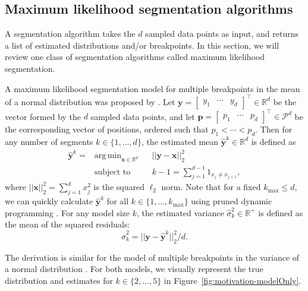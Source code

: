 \documentclass{jsfds} %
\DeclareMathOperator*{\argmin}{arg\,min}
\newcommand{\RR}{\mathbb{R}}
\begin{document}
\subsection{Maximum likelihood segmentation algorithms}

A segmentation algorithm takes the $d$ sampled data points as input,
and returns a list of estimated distributions and/or breakpoints. In
this section, we will review one class of segmentation algorithms
called maximum likelihood segmentation.

A maximum likelihood segmentation model for multiple breakpoints in
the mean of a normal distribution was proposed by
\citet{statistical-approach}. Let $\mathbf y = \left[
  \begin{array}{ccc}
    y_1 & \cdots & y_d
  \end{array}
\right]^\intercal \in \RR^d$ be the vector formed by the $d$
sampled data points, and let  $\mathbf p = \left[
  \begin{array}{ccc}
    p_1 & \cdots & p_d
  \end{array}
\right]^\intercal \in \mathcal P^d$ be the corresponding vector of
positions, ordered such that $p_1 < \cdots < p_d$. Then for any number
of segments $k\in\{1, \dots, d\}$, the estimated mean $\mathbf{\hat
  y}^k\in\RR^d$ is defined as
\begin{equation}
\label{eq:yhat^k}
\begin{aligned}
\mathbf{\hat  y}^k = &\argmin_{\mathbf x \in \RR^d} &&  ||\mathbf y - \mathbf x||^2_2
\\
&\text{subject to} && k-1=\sum_{j=1}^{d-1} 1_{x_j\neq x_{j+1}},
\end{aligned}
\end{equation}
where $||\mathbf x||^2_2=\sum_{j=1}^d x_j^2$ is the squared $\ell_2$
norm. Note that for a fixed $k_{\text{max}}\leq d$, we can quickly
calculate $\mathbf{\hat y}^k$ for all $k\in\{1,\dots,k_{\text{max}}\}$
using pruned dynamic programming \citep{pruned-dp}. For any model size
$k$, the estimated variance $\hat \sigma^2_k\in\RR^+$ is defined
as the mean of the squared residuals:
\begin{equation}
  \label{eq:sigmahat}
  \hat \sigma_k^2 = ||\mathbf y - \mathbf{\hat y}^k||^2_2/d.
\end{equation}

The derivation is similar for the model of multiple breakpoints in the
variance of a normal distribution \citep{pelt,segmentor}. For both
models, we visually represent the true distribution and estimates for
$k\in\{2, \dots, 5\}$ in Figure~\ref{fig:motivation-modelOnly}. 
\end{document}
